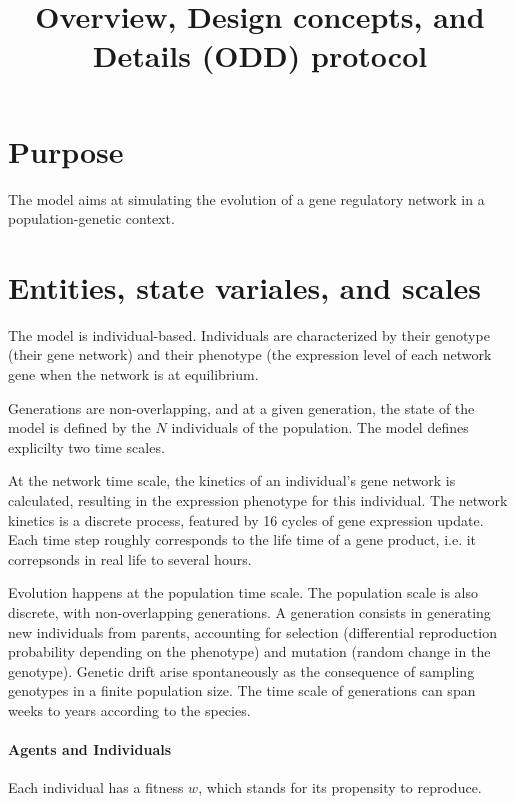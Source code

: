 \documentclass{article}
\title{Overview, Design concepts, and Details (ODD) protocol}
\begin{document}
\maketitle

\section{Purpose}

The model aims at simulating the evolution of a gene regulatory network in a population-genetic context. 

\section{Entities, state variales, and scales}

The model is individual-based. Individuals are characterized by their genotype (their gene network) and their phenotype (the expression level of each network gene when the network is at equilibrium. 

Generations are non-overlapping, and at a given generation, the state of the model is defined by the $N$ individuals of the population. The model defines explicilty two time scales. 

At the network time scale, the kinetics of an individual's gene network is calculated, resulting in the expression phenotype for this individual. The network kinetics is a discrete process, featured by 16 cycles of gene expression update. Each time step roughly corresponds to the life time of a gene product, i.e. it correpsonds in real life to several hours.

Evolution happens at the population time scale. The population scale is also discrete, with non-overlapping generations. A generation consists in generating new individuals from parents, accounting for selection (differential reproduction probability depending on the phenotype) and mutation (random change in the genotype). Genetic drift arise spontaneously as the consequence of sampling genotypes in a finite population size. The time scale of generations can span weeks to years according to the species. 

\paragraph{Agents and Individuals}

Each individual has a fitness $w$, which stands for its propensity to reproduce. 
\end{document}
